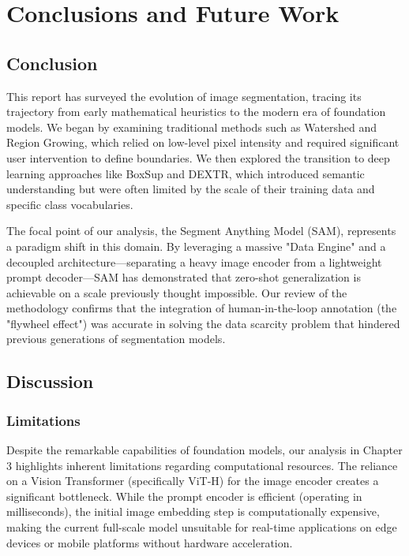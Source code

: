 \chapter{Conclusions and Future Work}

\section{Conclusion}
This report has surveyed the evolution of image segmentation, tracing its trajectory from early mathematical heuristics to the modern era of foundation models. We began by examining traditional methods such as Watershed and Region Growing, which relied on low-level pixel intensity and required significant user intervention to define boundaries. We then explored the transition to deep learning approaches like BoxSup and DEXTR, which introduced semantic understanding but were often limited by the scale of their training data and specific class vocabularies.

The focal point of our analysis, the Segment Anything Model (SAM), represents a paradigm shift in this domain. By leveraging a massive "Data Engine" and a decoupled architecture—separating a heavy image encoder from a lightweight prompt decoder—SAM has demonstrated that zero-shot generalization is achievable on a scale previously thought impossible. Our review of the methodology confirms that the integration of human-in-the-loop annotation (the "flywheel effect") was accurate in solving the data scarcity problem that hindered previous generations of segmentation models.

\section{Discussion}

\subsection{Limitations}
Despite the remarkable capabilities of foundation models, our analysis in Chapter 3 highlights inherent limitations regarding computational resources. The reliance on a Vision Transformer (specifically ViT-H) for the image encoder creates a significant bottleneck. While the prompt encoder is efficient (operating in milliseconds), the initial image embedding step is computationally expensive, making the current full-scale model unsuitable for real-time applications on edge devices or mobile platforms without hardware acceleration.

